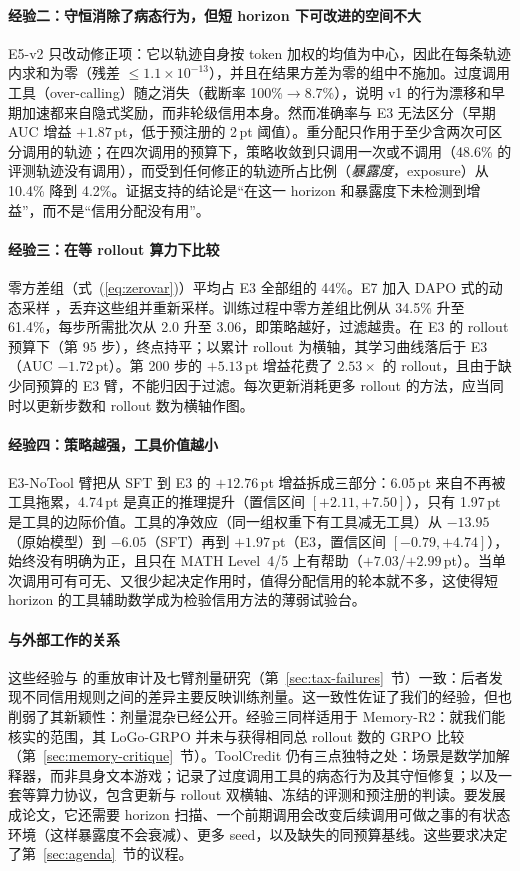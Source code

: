 \paragraph{经验二：守恒消除了病态行为，但短 horizon 下可改进的空间不大}
E5-v2 只改动修正项：它以轨迹自身按 token 加权的均值为中心，因此在每条轨迹内求和为零（残差 ${\le}1.1{\times}10^{-13}$），并且在结果方差为零的组中不施加。过度调用工具（over-calling）随之消失（截断率 100\%$\to$8.7\%），说明 v1 的行为漂移和早期加速都来自隐式奖励，而非轮级信用本身。然而准确率与 E3 无法区分（早期 AUC 增益 $+1.87$\,pt，低于预注册的 2\,pt 阈值）。重分配只作用于至少含两次可区分调用的轨迹；在四次调用的预算下，策略收敛到只调用一次或不调用（48.6\% 的评测轨迹没有调用），而受到任何修正的轨迹所占比例（\emph{暴露度}，exposure）从 10.4\% 降到 4.2\%。证据支持的结论是“在这一 horizon 和暴露度下未检测到增益”，而不是“信用分配没有用”。

\paragraph{经验三：在等 rollout 算力下比较}
零方差组（式~(\ref{eq:zerovar})）平均占 E3 全部组的 44\%。E7 加入 DAPO 式的动态采样 \citep{yu2025dapo}，丢弃这些组并重新采样。训练过程中零方差组比例从 34.5\% 升至 61.4\%，每步所需批次从 2.0 升至 3.06，即策略越好，过滤越贵。在 E3 的 rollout 预算下（第 95 步），终点持平；以累计 rollout 为横轴，其学习曲线落后于 E3（AUC $-1.72$\,pt）。第 200 步的 $+5.13$\,pt 增益花费了 $2.53\times$ 的 rollout，且由于缺少同预算的 E3 臂，不能归因于过滤。每次更新消耗更多 rollout 的方法，应当同时以更新步数和 rollout 数为横轴作图。

\paragraph{经验四：策略越强，工具价值越小}
E3-NoTool 臂把从 SFT 到 E3 的 $+12.76$\,pt 增益拆成三部分：6.05\,pt 来自不再被工具拖累，4.74\,pt 是真正的推理提升（置信区间 $[+2.11, +7.50]$），只有 1.97\,pt 是工具的边际价值。工具的净效应（同一组权重下有工具减无工具）从 $-13.95$（原始模型）到 $-6.05$（SFT）再到 $+1.97$\,pt（E3，置信区间 $[-0.79, +4.74]$），始终没有明确为正，且只在 MATH Level~4/5 上有帮助（$+7.03$/$+2.99$\,pt）。当单次调用可有可无、又很少起决定作用时，值得分配信用的轮本就不多，这使得短 horizon 的工具辅助数学成为检验信用方法的薄弱试验台。

\paragraph{与外部工作的关系}
这些经验与 \citet{zhang2026credit} 的重放审计及七臂剂量研究（第~\ref{sec:tax-failures}~节）一致：后者发现不同信用规则之间的差异主要反映训练剂量\unverified。这一致性佐证了我们的经验，但也削弱了其新颖性：剂量混杂已经公开。经验三同样适用于 Memory-R2：就我们能核实的范围，其 LoGo-GRPO 并未与获得相同总 rollout 数的 GRPO 比较（第~\ref{sec:memory-critique}~节）\unverified。ToolCredit 仍有三点独特之处：场景是数学加解释器，而非具身文本游戏；记录了过度调用工具的病态行为及其守恒修复；以及一套等算力协议，包含更新与 rollout 双横轴、冻结的评测和预注册的判读。要发展成论文，它还需要 horizon 扫描、一个前期调用会改变后续调用可做之事的有状态环境（这样暴露度不会衰减）、更多 seed，以及缺失的同预算基线。这些要求决定了第~\ref{sec:agenda}~节的议程。
